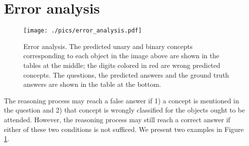 \documentclass[10pt,twocolumn,letterpaper]{article}
\begin{document}
\section{Error analysis}
\begin{figure}
\centering
\texttt{[image: ./pics/error\_analysis.pdf]}
\caption{Error analysis. The predicted unary and binary concepts corresponding to each object in the image above are shown in the tables at the middle; the digits colored in red are wrong predicted concepts. The questions, the predicted answers and the ground truth answers are shown in the table at the bottom.}
\label{error_analysis}
\end{figure}

The reasoning process may reach a false answer if 1) a concept is mentioned in the question and 2) that concept is wrongly classified for the objects ought to be attended. However, the reasoning process may still reach a correct answer if either of these two conditions is not sufficed. We present two examples in Figure \ref{error_analysis}.
\end{document}
